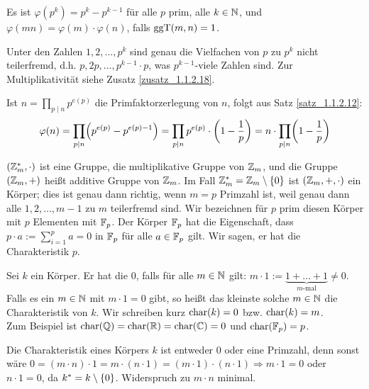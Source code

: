 \begin{satz}
\label{satz_1.1.2.12}
	Es ist $\varphi(p^k) = p^k - p^{k-1}$ für alle $p$ prim, alle $k \in \mathbb{N}$, und $\varphi(mn) = \varphi(m) \cdot \varphi(n)$, falls $\operatorname{ggT}(m,n) = 1$.
\end{satz}

	Unter den Zahlen $1,2, \dots, p^k$ sind genau die Vielfachen von $p$ zu $p^k$ nicht teilerfremd, d.h. $p, 2p, \dots, p^{k-1} \cdot p$, was $p^{k-1}$-viele Zahlen sind. Zur Multiplikativität siehe Zusatz \ref{zusatz_1.1.2.18}.
	
Ist $n = \prod_{p \mid n} p^{e(p)}$ die Primfaktorzerlegung von $n$, folgt aus Satz \ref{satz_1.1.2.12}:
\[ \varphi(n) = \prod_{p \mid n} \enbrace*{p^{e(p)} - p^{e(p)-1}} = \prod_{p \mid n} p^{e(p)} \cdot \enbrace*{1-\frac{1}{p}} = n \cdot \prod_{p \mid n} \enbrace*{1-\frac{1}{p}} \]

\begin{folg}
	$(\mathbb{Z}_m^*,\cdot)$ ist eine Gruppe, die multiplikative Gruppe von $\mathbb{Z}_m$, und die Gruppe $(\mathbb{Z}_m,+)$ heißt additive Gruppe von $\mathbb{Z}_m$. Im Fall $\mathbb{Z}_m^* = \mathbb{Z}_m \setminus \{0\}$ ist $(\mathbb{Z}_m,+,\cdot)$ ein Körper; dies ist genau dann richtig, wenn $m = p$ Primzahl ist, weil genau dann alle $1,2, \dots, m-1$ zu $m$ teilerfremd sind. Wir bezeichnen für $p$ prim diesen Körper mit $p$ Elementen mit $\mathbb{F}_p$.  Der Körper $\mathbb{F}_p$ hat die Eigenschaft, dass $p \cdot a := \sum_{i=1}^{p} a = 0$ in $\mathbb{F}_p$ für alle $a \in \mathbb{F}_p$ gilt. Wir sagen, er hat die Charakteristik $p$.
\end{folg}

\begin{defn}[Charakteristik]
	Sei $k$ ein Körper. Er hat die  $0$, falls für alle $m \in \mathbb{N}$ gilt: $m \cdot 1 := \underbrace{1 + \dots + 1}_{m\text{-mal}} \neq 0$. \\
	Falls es ein $m \in \mathbb{N}$ mit $m \cdot 1 = 0$ gibt, so heißt das kleinste solche $m \in \mathbb{N}$ die Charakteristik von $k$. Wir schreiben kurz $\operatorname{char}(k) = 0$ bzw. $\operatorname{char}(k) = m$. \\
	Zum Beispiel ist $\operatorname{char}(\mathbb{Q}) = \operatorname{char}(\mathbb{R}) = \operatorname{char}(\mathbb{C}) = 0$ und $\operatorname{char}(\mathbb{F}_p) = p$.
\end{defn}

	Die Charakteristik eines Körpers $k$ ist entweder $0$ oder eine Primzahl, denn sonst wäre $0 = (m\cdot n) \cdot 1 = m \cdot (n \cdot 1) = (m \cdot 1) \cdot (n \cdot 1) \Rightarrow m \cdot 1 = 0$ oder $n \cdot 1 = 0$, da $k^* = k \setminus \{0\}$. Widerspruch zu $m\cdot n$ minimal.

